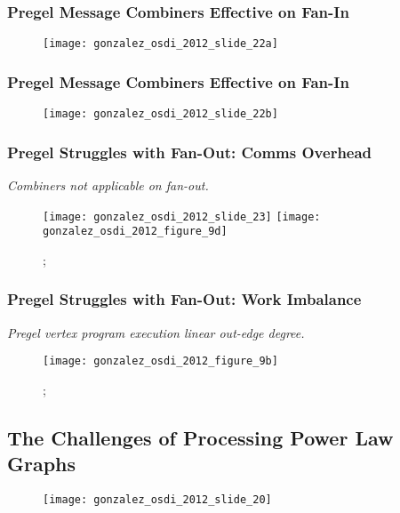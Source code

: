 \begin{frame}
  \frametitle{Pregel Message Combiners Effective on Fan-In}
  \begin{figure}
    \centering
    \texttt{[image: gonzalez\_osdi\_2012\_slide\_22a]}
    \caption{\cite[OSDI '12 Slides]{gonzalez2012powergraph-slides}}
  \end{figure}
\end{frame}

\begin{frame}
  \frametitle{Pregel Message Combiners Effective on Fan-In}
  \begin{figure}
    \centering
    \texttt{[image: gonzalez\_osdi\_2012\_slide\_22b]}
    \caption{\cite[OSDI '12 Slides]{gonzalez2012powergraph-slides}}
  \end{figure}
\end{frame}

\begin{frame}
  \frametitle{Pregel Struggles with Fan-Out: Comms Overhead}
  \centering
  \large{\textit{Combiners not applicable on fan-out.}}
  \begin{figure}
    \texttt{[image: gonzalez\_osdi\_2012\_slide\_23]}
    \texttt{[image: gonzalez\_osdi\_2012\_figure\_9d]}
    \caption{\cite[OSDI '12 Slides]{gonzalez2012powergraph-slides};
    \cite[OSDI '12]{gonzalez2012powergraph}}
  \end{figure}
\end{frame}

\begin{frame}
  \frametitle{Pregel Struggles with Fan-Out: Work Imbalance}
  \centering
  \large
  \textit{Pregel vertex program execution linear out-edge degree.}

  \begin{figure}
    \texttt{[image: gonzalez\_osdi\_2012\_figure\_9b]}
    \caption{\cite[OSDI '12 Slides]{gonzalez2012powergraph-slides};
    \cite[OSDI '12]{gonzalez2012powergraph}}
  \end{figure}
\end{frame}


\subsection{The Challenges of Processing Power Law Graphs}

\begin{frame}
  \begin{figure}
    \centering
    \texttt{[image: gonzalez\_osdi\_2012\_slide\_20]}
    \caption{\cite[OSDI '12]{gonzalez2012powergraph-slides}}
  \end{figure}
\end{frame}

